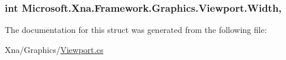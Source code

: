 \subsubsection[{Width}]{\setlength{\rightskip}{0pt plus 5cm}int Microsoft.\+Xna.\+Framework.\+Graphics.\+Viewport.\+Width\hspace{0.3cm}{\ttfamily [get]}, {\ttfamily [set]}}\label{struct_microsoft_1_1_xna_1_1_framework_1_1_graphics_1_1_viewport_ab132ca62f33dec7c17c06e6e1ef4528b}


The documentation for this struct was generated from the following file\+:\begin{DoxyCompactItemize}
\item 
Xna/\+Graphics/\hyperlink{_viewport_8cs}{Viewport.\+cs}\end{DoxyCompactItemize}
